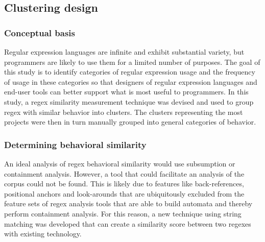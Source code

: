 \subsection{Clustering design}

\subsubsection{Conceptual basis}
Regular expression languages are infinite and exhibit substantial variety, but programmers are likely to use them for a limited number of purposes.  The goal of this study is to identify categories of regular expression usage and the frequency of usage in these categories so that designers of regular expression languages and end-user tools can better support what is most useful to programmers.  In this study, a regex similarity measurement technique was devised and used to group regex with similar behavior into clusters.  The clusters representing the most projects were then in turn manually grouped into general categories of behavior.


\subsubsection{Determining behavioral similarity}
An ideal analysis of regex behavioral similarity would use subsumption or containment analysis. However, a tool that could facilitate an analysis of the corpus could not be found.  This is likely due to features like back-references, positional anchors and look-arounds that are ubiquitously excluded from the feature sets of regex analysis tools that are able to build automata and thereby perform containment analysis.  For this reason, a new technique using string matching was developed that can create a similarity score between two regexes with existing technology.


